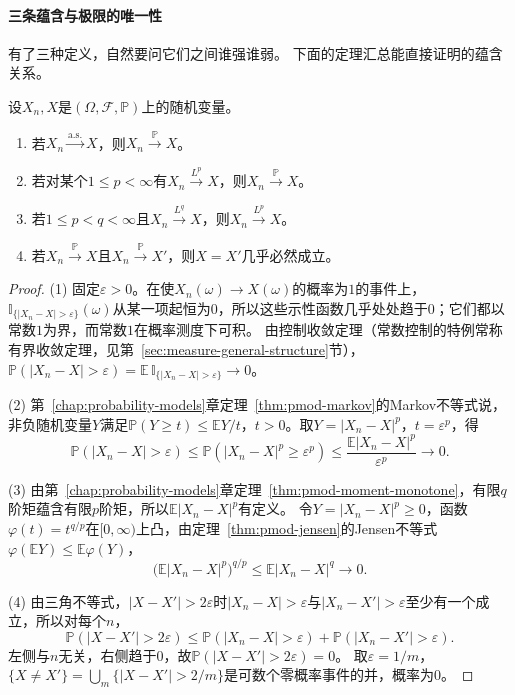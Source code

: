 \paragraph{三条蕴含与极限的唯一性}
有了三种定义，自然要问它们之间谁强谁弱。
下面的定理汇总能直接证明的蕴含关系。

\begin{theorem}[收敛方式之间的蕴含]
\label{thm:conv-implications}
设$X_n,X$是$(\Omega,\mathcal F,\mathbb P)$上的随机变量。
\begin{enumerate}
  \item 若$X_n\xrightarrow{\mathrm{a.s.}}X$，则$X_n\xrightarrow{\mathbb P}X$。
  \item 若对某个$1\leq p<\infty$有$X_n\xrightarrow{L^p}X$，则$X_n\xrightarrow{\mathbb P}X$。
  \item 若$1\leq p<q<\infty$且$X_n\xrightarrow{L^q}X$，则$X_n\xrightarrow{L^p}X$。
  \item 若$X_n\xrightarrow{\mathbb P}X$且$X_n\xrightarrow{\mathbb P}X'$，则$X=X'$几乎必然成立。
\end{enumerate}
\end{theorem}

\begin{proof}
(1) 固定$\varepsilon>0$。在使$X_n(\omega)\to X(\omega)$的概率为$1$的事件上，$\mathbb I_{\{|X_n-X|>\varepsilon\}}(\omega)$从某一项起恒为$0$，所以这些示性函数几乎处处趋于$0$；它们都以常数$1$为界，而常数$1$在概率测度下可积。
由控制收敛定理（常数控制的特例常称有界收敛定理，见第~\ref{sec:measure-general-structure}节），$\mathbb P(|X_n-X|>\varepsilon)=\mathbb E\,\mathbb I_{\{|X_n-X|>\varepsilon\}}\to0$。

(2) 第~\ref{chap:probability-models}章定理~\ref{thm:pmod-markov}的Markov不等式说，非负随机变量$Y$满足$\mathbb P(Y\geq t)\leq\mathbb EY/t$，$t>0$。取$Y=|X_n-X|^p$，$t=\varepsilon^p$，得
\[
  \mathbb P(|X_n-X|>\varepsilon)\leq\mathbb P(|X_n-X|^p\geq\varepsilon^p)\leq\frac{\mathbb E|X_n-X|^p}{\varepsilon^p}\to0.
\]

(3) 由第~\ref{chap:probability-models}章定理~\ref{thm:pmod-moment-monotone}，有限$q$阶矩蕴含有限$p$阶矩，所以$\mathbb E|X_n-X|^p$有定义。
令$Y=|X_n-X|^p\geq0$，函数$\varphi(t)=t^{q/p}$在$[0,\infty)$上凸，由定理~\ref{thm:pmod-jensen}的Jensen不等式$\varphi(\mathbb EY)\leq\mathbb E\varphi(Y)$，
\[
  \bigl(\mathbb E|X_n-X|^p\bigr)^{q/p}\leq\mathbb E|X_n-X|^q\to0.
\]

(4) 由三角不等式，$|X-X'|>2\varepsilon$时$|X_n-X|>\varepsilon$与$|X_n-X'|>\varepsilon$至少有一个成立，所以对每个$n$，
\[
  \mathbb P(|X-X'|>2\varepsilon)\leq\mathbb P(|X_n-X|>\varepsilon)+\mathbb P(|X_n-X'|>\varepsilon).
\]
左侧与$n$无关，右侧趋于$0$，故$\mathbb P(|X-X'|>2\varepsilon)=0$。
取$\varepsilon=1/m$，$\{X\neq X'\}=\bigcup_m\{|X-X'|>2/m\}$是可数个零概率事件的并，概率为$0$。
\end{proof}

